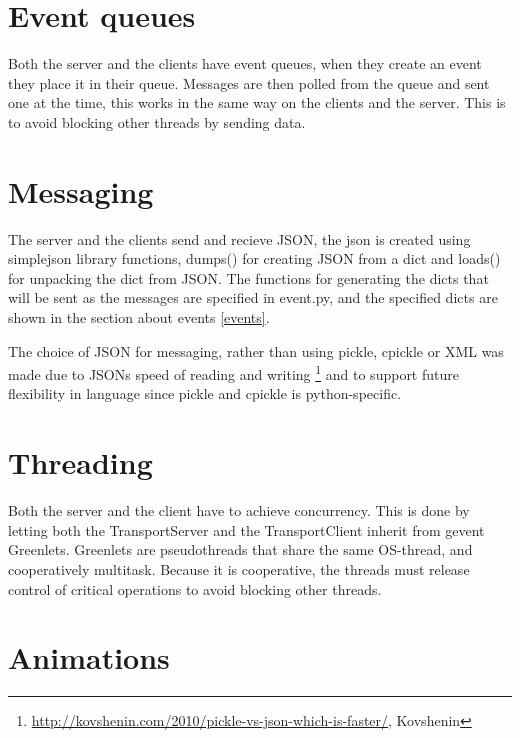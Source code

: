 
\section{Event queues}
Both the server and the clients have event queues, when they create an event they place it in their queue. Messages are then polled from the queue and sent one at the time, this works in the same way on the clients and the server. This is to avoid blocking other threads by sending data. 

\section{Messaging}
The server and the clients send and recieve JSON, the json is created using simplejson library functions, dumps() for creating JSON from a dict and loads() for unpacking the dict from JSON. The functions for generating the dicts that will be sent as the messages are specified in event.py, and the specified dicts are shown in the section about events \ref{events}. 

The choice of JSON for messaging, rather than using pickle, cpickle or XML was made due to JSONs speed of reading and writing \footnote{\url{http://kovshenin.com/2010/pickle-vs-json-which-is-faster/}, Kovshenin} and to support future flexibility in language since pickle and cpickle is python-specific. 



\section{Threading}
\label{sec:threading}

Both the server and the client have to achieve concurrency. This is done by letting both the TransportServer and the TransportClient inherit from gevent Greenlets. 
Greenlets are pseudothreads that share the same OS-thread, and cooperatively multitask. Because it is cooperative, the threads must release control of critical operations to avoid blocking other threads. 

\section{Animations}

